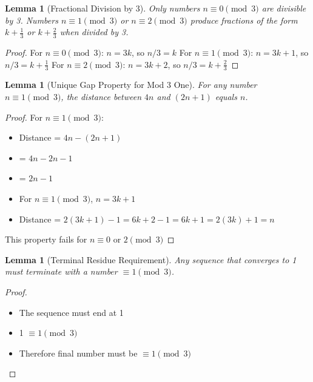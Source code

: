 \documentclass[11pt]{article}
\newtheorem{lemma}[theorem]{Lemma}
\begin{document}
\begin{lemma}[Fractional Division by 3]
Only numbers \(n \equiv 0 \pmod{3}\) are divisible by 3. Numbers \(n \equiv 1 \pmod{3}\) or \(n \equiv 2 \pmod{3}\) produce fractions of the form \(k + \tfrac{1}{3}\) or \(k + \tfrac{2}{3}\) when divided by 3.
\end{lemma}

\begin{proof}
For \(n \equiv 0 \pmod{3}\): \(n = 3k\), so \(n/3 = k\)
For \(n \equiv 1 \pmod{3}\): \(n = 3k + 1\), so \(n/3 = k + \tfrac{1}{3}\)
For \(n \equiv 2 \pmod{3}\): \(n = 3k + 2\), so \(n/3 = k + \tfrac{2}{3}\)
\end{proof}

\begin{lemma}[Unique Gap Property for Mod 3 One]
For any number \(n \equiv 1 \pmod{3}\), the distance between \(4n\) and \((2n + 1)\) equals \(n\).
\end{lemma}

\begin{proof}
For \(n \equiv 1 \pmod{3}\):
\begin{itemize}
    \item Distance = \(4n - (2n + 1)\)
    \item = \(4n - 2n - 1\)
    \item = \(2n - 1\)
    \item For \(n \equiv 1 \pmod{3}\), \(n = 3k + 1\)
    \item Distance = \(2(3k + 1) - 1 = 6k + 2 - 1 = 6k + 1 = 2(3k) + 1 = n\)
\end{itemize}
This property fails for \(n \equiv 0\) or \(2 \pmod{3}\)
\end{proof}

\begin{lemma}[Terminal Residue Requirement]
Any sequence that converges to 1 must terminate with a number \(\equiv 1 \pmod{3}\).
\end{lemma}

\begin{proof}
\begin{itemize}
    \item The sequence must end at 1
    \item 1 \(\equiv 1 \pmod{3}\)
    \item Therefore final number must be \(\equiv 1 \pmod{3}\)
\end{itemize}
\end{proof}
\end{document}
